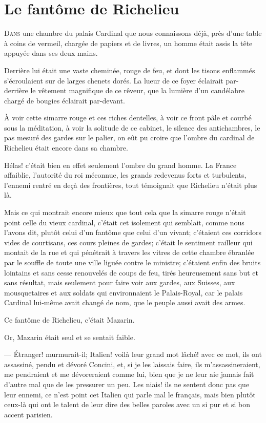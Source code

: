 \chapter{Le fantôme de Richelieu}

\lettrine{D}{ans} une chambre du palais Cardinal que nous connaissons déjà, près d'une table à coins de vermeil, chargée de papiers et de livres, un homme était assis la tête appuyée dans ses deux mains.

\zz
Derrière lui était une vaste cheminée, rouge de feu, et dont les tisons enflammés s'écroulaient sur de larges chenets dorés. La lueur de ce foyer éclairait par-derrière le vêtement magnifique de ce rêveur, que la lumière d'un candélabre chargé de bougies éclairait par-devant.

À voir cette simarre rouge et ces riches dentelles, à voir ce front pâle et courbé sous la méditation, à voir la solitude de ce cabinet, le silence des antichambres, le pas mesuré des gardes sur le palier, on eût pu croire que l'ombre du cardinal de Richelieu était encore dans sa chambre.

Hélas! c'était bien en effet seulement l'ombre du grand homme. La France affaiblie, l'autorité du roi méconnue, les grands redevenus forts et turbulents, l'ennemi rentré en deçà des frontières, tout témoignait que Richelieu n'était plus là.

Mais ce qui montrait encore mieux que tout cela que la simarre rouge n'était point celle du vieux cardinal, c'était cet isolement qui semblait, comme nous l'avons dit, plutôt celui d'un fantôme que celui d'un vivant; c'étaient ces corridors vides de courtisans, ces cours pleines de gardes; c'était le sentiment railleur qui montait de la rue et qui pénétrait à travers les vitres de cette chambre ébranlée par le souffle de toute une ville liguée contre le ministre; c'étaient enfin des bruits lointains et sans cesse renouvelés de coups de feu, tirés heureusement sans but et sans résultat, mais seulement pour faire voir aux gardes, aux Suisses, aux mousquetaires et aux soldats qui environnaient le Palais-Royal, car le palais Cardinal lui-même avait changé de nom, que le peuple aussi avait des armes.

Ce fantôme de Richelieu, c'était Mazarin.

Or, Mazarin était seul et se sentait faible.

— Étranger! murmurait-il; Italien! voilà leur grand mot lâché! avec ce mot, ils ont assassiné, pendu et dévoré Concini, et, si je les laissais faire, ils m'assassineraient, me pendraient et me dévoreraient comme lui, bien que je ne leur aie jamais fait d'autre mal que de les pressurer un peu. Les niais! ils ne sentent donc pas que leur ennemi, ce n'est point cet Italien qui parle mal le français, mais bien plutôt ceux-là qui ont le talent de leur dire des belles paroles avec un si pur et si bon accent parisien.


